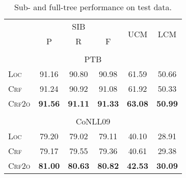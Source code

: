 \begin{table}[tb]
\setlength{\tabcolsep}{5pt}
\centering
\begin{tabular}{lccccc}
\toprule
& \multicolumn{3}{c}{SIB} & \multirow{2}{*}{UCM} & \multirow{2}{*}{LCM} \\
& P & R & F \\[2pt]
\hline
\\[-9pt]
\multicolumn{6}{c}{PTB} \\
\textsc{Loc}  & 91.16 & 90.80 & 90.98 & 61.59 & 50.66 \\
\textsc{Crf}    & 91.24 & 90.92 & 91.08 & 61.92 & 50.33 \\
\textsc{Crf2o} & \textbf{91.56} & \textbf{91.11} & \textbf{91.33} & \textbf{63.08} & \textbf{50.99} \\[2pt]
\hline
\\[-9pt]
\multicolumn{6}{c}{CoNLL09} \\
\textsc{Loc}  & 79.20 & 79.02 & 79.11 & 40.10 & 28.91 \\
\textsc{Crf}    & 79.17 & 79.55 & 79.36 & 40.61 & 29.38 \\
\textsc{Crf2o} & \textbf{81.00} & \textbf{80.63} & \textbf{80.82} & \textbf{42.53} & \textbf{30.09} \\
\bottomrule
\end{tabular}
\caption{Sub- and full-tree performance on test data.}
\label{table:dev-test-subtree}

\end{table}
